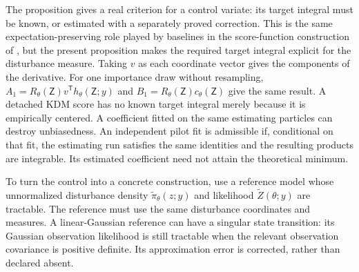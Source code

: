 \documentclass[11pt]{article}
\begin{document}
The proposition gives a real criterion for a control variate: its target
integral must be known, or estimated with a separately proved correction.
This is the same expectation-preserving role played by baselines in the
score-function construction of \citet[Theorem 1 and equation (4.7)]{foerster2018dice},
but the present proposition makes the required target integral explicit for
the disturbance measure. Taking $v$ as each coordinate vector gives the
components of the derivative. For one importance draw without resampling,
$A_1=R_\theta(\mathsf Z)v^{\mathsf T}h_\theta(\mathsf Z;y)$ and
$B_1=R_\theta(\mathsf Z)c_\theta(\mathsf Z)$ give the same result.
A detached KDM score has no known target integral merely because it is
empirically centered. A coefficient fitted on the same estimating particles
can destroy unbiasedness. An independent pilot fit is admissible if,
conditional on that fit, the estimating run satisfies the same identities
and the resulting products are integrable. Its estimated coefficient need
not attain the theoretical minimum.

To turn the control into a concrete construction, use a reference model whose
unnormalized disturbance density $\widetilde\pi_\theta(z;y)$ and likelihood
$\widetilde Z(\theta;y)$ are tractable. The reference must use the same
disturbance coordinates and measures. A linear-Gaussian reference can have a
singular state transition: its Gaussian observation likelihood is still
tractable when the relevant observation covariance is positive definite.
Its approximation error is corrected, rather than declared absent.
\end{document}
